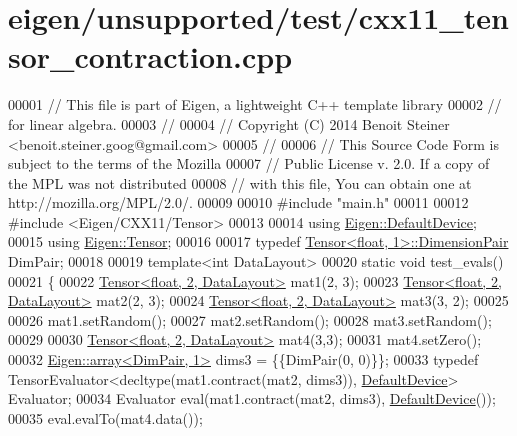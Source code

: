 \hypertarget{eigen_2unsupported_2test_2cxx11__tensor__contraction_8cpp_source}{}\section{eigen/unsupported/test/cxx11\+\_\+tensor\+\_\+contraction.cpp}
\label{eigen_2unsupported_2test_2cxx11__tensor__contraction_8cpp_source}

\begin{DoxyCode}
00001 \textcolor{comment}{// This file is part of Eigen, a lightweight C++ template library}
00002 \textcolor{comment}{// for linear algebra.}
00003 \textcolor{comment}{//}
00004 \textcolor{comment}{// Copyright (C) 2014 Benoit Steiner <benoit.steiner.goog@gmail.com>}
00005 \textcolor{comment}{//}
00006 \textcolor{comment}{// This Source Code Form is subject to the terms of the Mozilla}
00007 \textcolor{comment}{// Public License v. 2.0. If a copy of the MPL was not distributed}
00008 \textcolor{comment}{// with this file, You can obtain one at http://mozilla.org/MPL/2.0/.}
00009 
00010 \textcolor{preprocessor}{#include "main.h"}
00011 
00012 \textcolor{preprocessor}{#include <Eigen/CXX11/Tensor>}
00013 
00014 \textcolor{keyword}{using} \hyperlink{struct_eigen_1_1_default_device}{Eigen::DefaultDevice};
00015 \textcolor{keyword}{using} \hyperlink{class_eigen_1_1_tensor}{Eigen::Tensor};
00016 
00017 \textcolor{keyword}{typedef} \hyperlink{class_eigen_1_1_tensor}{Tensor<float, 1>::DimensionPair} DimPair;
00018 
00019 \textcolor{keyword}{template}<\textcolor{keywordtype}{int} DataLayout>
00020 \textcolor{keyword}{static} \textcolor{keywordtype}{void} test\_evals()
00021 \{
00022   \hyperlink{class_eigen_1_1_tensor}{Tensor<float, 2, DataLayout>} mat1(2, 3);
00023   \hyperlink{class_eigen_1_1_tensor}{Tensor<float, 2, DataLayout>} mat2(2, 3);
00024   \hyperlink{class_eigen_1_1_tensor}{Tensor<float, 2, DataLayout>} mat3(3, 2);
00025 
00026   mat1.setRandom();
00027   mat2.setRandom();
00028   mat3.setRandom();
00029 
00030   \hyperlink{class_eigen_1_1_tensor}{Tensor<float, 2, DataLayout>} mat4(3,3);
00031   mat4.setZero();
00032   \hyperlink{class_eigen_1_1array}{Eigen::array<DimPair, 1>} dims3 = \{\{DimPair(0, 0)\}\};
00033   \textcolor{keyword}{typedef} TensorEvaluator<decltype(mat1.contract(mat2, dims3)), \hyperlink{struct_eigen_1_1_default_device}{DefaultDevice}> Evaluator;
00034   Evaluator eval(mat1.contract(mat2, dims3), \hyperlink{struct_eigen_1_1_default_device}{DefaultDevice}());
00035   eval.evalTo(mat4.data());

\end{DoxyCode}

